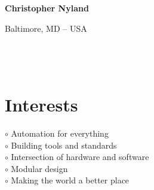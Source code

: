 \documentclass[a4paper,10pt]{article}
\begin{document}
\thispagestyle{empty}

\begin{adjustbox}{valign=t}
\begin{minipage}{0.3\textwidth} %
\begin{center}

\MySkip 	%

{\LARGE \bfseries Christopher Nyland}

\MySkip 	%

\textcolor{ColorTwo}{\faHome}
\textcolor{ColorTwo}{Baltimore, MD -- USA}\\

\textcolor{ColorTwo}{\faEnvelopeO}
 \\

\textcolor{ColorTwo}{\faGithub} \\

\textcolor{ColorTwo}{\faChain}
 \\
\end{center}

\vfill

\section*{Interests}
\raggedright
\textcolor{ColorOne}{$\circ$} Automation for everything\\
\textcolor{ColorOne}{$\circ$} Building tools and standards\\
\textcolor{ColorOne}{$\circ$} Intersection of hardware and software\\
\textcolor{ColorOne}{$\circ$} Modular design\\
\textcolor{ColorOne}{$\circ$} Making the world a better place\\


\end{minipage}
\end{adjustbox}
\end{document}

